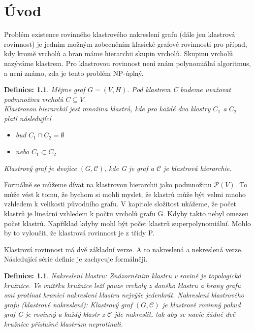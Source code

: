\documentclass[12pt,a4report]{report}
\newtheorem{def1}{Definice: }
\newtheorem{def2}{Definice: }
\begin{document}
\author{Filip Šedivý}

\chapter{Úvod}
Problém existence rovinného klastrového nakreslení grafu (dále jen klastrová rovinnost) je jedním možným zobecněním klasické grafové rovinnosti pro případ, kdy kromě vrcholů a hran máme hierarchii skupin vrcholů. Skupinu vrcholů nazýváme klastrem. Pro klastrovou rovinnost není znám polynomiální algoritmus, a není známo, zda je tento problém NP-úplný. 

\begin{def1}
Mějme graf $G=(V,H)$. Pod klastrem C budeme uvažovat podmnožinu vrcholů  $C \subseteq V$. \\
Klastrovou hierarchií jest množina klastrů, kde pro každé dva klastry $C_1$ a $C_2$ platí následující
\begin{itemize}
\item buď $C_1 \cap C_2 = \emptyset$
\item nebo $C_1 \subset C_2$
\end{itemize}
Klastrový graf je dvojice $\left(G,\mathcal C\right)$, kde G je graf a $\mathcal C$ je klastrová hierarchie.
\end{def1}

\par
Formálně se můžeme dívat na klastrovou hierarchii jako podmnožinu $\mathcal P \left({V}\right)$. To může vést k tomu, že bychom si mohli myslet, že klastrů může být velmi mnoho vzhledem k velikosti původního grafu. V kapitole složitost ukážeme, že počet klastrů je lineární vzhledem k počtu vrcholů grafu G. Kdyby takto nebyl omezen počet klastrů. Například kdyby mohl být počet klastrů superpolynomiální. Mohlo by to vyloučit, že klastrová rovinnost je z třídy P.

Klastrová rovinnost má dvě základní verze. A to nakreslená a nekreslená verze. Následující série definic je zachycuje formálněji.
\begin{def2}
Nakreslení klastru: Znázorněním klastru v rovině je topologická kružnice. Ve vnitřku kružnice leží pouze vrcholy z daného klastru a hrany grafu smí protínat hranici nakreslení klastru nejvýše jedenkrát.
Nakreslení klastrového grafu (klastrové nakreslení): Klastrový graf $\left(G,\mathcal C\right)$ je klastrově rovinný pokud graf G je rovinný a každý klastr z $\mathcal C$ jde nakreslit, tak aby se navíc žádné dvě kružnice příslušné klastrům neprotínali.
\end{def2}
\end{document}
